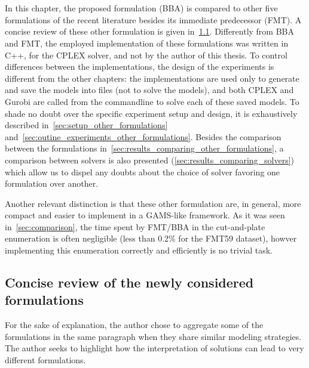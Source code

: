 \chapter{\protect{}}
\label{sec:martin_chapter}

In this chapter, the proposed formulation (BBA) is compared to other five formulations of the recent literature besides its immediate predecessor (FMT).
A concise review of these other formulation is given in~\cref{sec:other_formulations}.
Differently from BBA and FMT, the employed implementation of these formulations was written in C++, for the CPLEX solver, and not by the author of this thesis.
To control differences between the implementations, the design of the experiments is different from the other chapters: the implementations are used only to generate and save the models into files (not to solve the models), and both CPLEX and Gurobi are called from the commandline to solve each of these saved models.
To shade no doubt over the specific experiment setup and design, it is exhaustively described in~\cref{sec:setup_other_formulations} and~\cref{sec:outine_experiments_other_formulations}.
Besides the comparison between the formulations in~\cref{sec:results_comparing_other_formulations}, a comparison between solvers is also presented (\cref{sec:results_comparing_solvers}) which allow us to dispel any doubts about the choice of solver favoring one formulation over another.

Another relevant distinction is that these other formulation are, in general, more compact and easier to implement in a GAMS-like framework.
As it was seen in~\cref{sec:comparison}, the time spent by FMT/BBA in the cut-and-plate enumeration is often negligible (less than 0.2\% for the FMT59 dataset), howver implementing this enumeration correctly and efficiently is no trivial task.

\section{Concise review of the newly considered formulations}
\label{sec:other_formulations}

For the sake of explanation, the author chose to aggregate some of the formulations in the same paragraph when they share similar modeling strategies.
The author seeks to highlight how the interpretation of solutions can lead to very different formulations.

